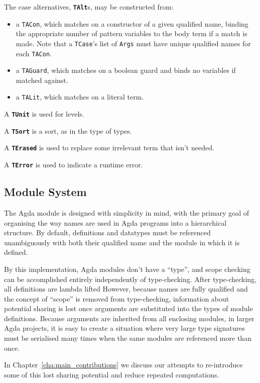 The case alternatives, \textbf{\lstinline{TAlt}}s, may be constructed from:
\begin{itemize}
\item a \lstinline{TACon}, which matches on a constructor of a given qualified name, binding the appropriate number of pattern variables to the body term if a match is made. Note that a \lstinline{TCase}'s list of \lstinline{Args} must have unique qualified names for each \lstinline{TACon}.
\item a \lstinline{TAGuard}, which matches on a boolean guard and binds no variables if matched against.
\item a \lstinline{TALit}, which matches on a literal term.
\end{itemize}

A \textbf{\lstinline{TUnit}} is used for levels.

A \textbf{\lstinline{TSort}} is a sort, as in the type of types.

A \textbf{\lstinline{TErased}} is used to replace some irrelevant term that isn't needed.

A \textbf{\lstinline{TError}} is used to indicate a runtime error.

\subsection{Module System}

The Agda module is designed with simplicity in mind, with the primary goal of organising the way names are used in Agda programs into a hierarchical structure. By default, definitions and datatypes must be referenced unambiguously with both their qualified name and the module in which it is defined.

By this implementation, Agda modules don't have a ``type'', and scope checking can be accomplished entirely independently of type-checking. After type-checking, all definitions are lambda lifted \citep{agdadocs} However, because names are fully qualified and the concept of ``scope'' is removed from type-checking, information about potential sharing is lost once arguments are substituted into the types of module definitions. Because arguments are inherited from all enclosing modules, in larger Agda projects, it is easy to create a situation where very large type signatures must be serialised many times when the same modules are referenced more than once.\citep{agdamail} %

In Chapter~\ref{cha:main_contributions} we discuss our attempts to re-introduce some of this lost sharing potential and reduce repeated computations.
